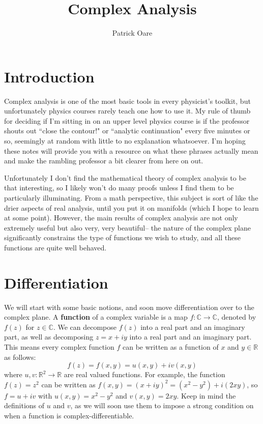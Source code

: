 \documentclass[11pt, oneside]{article}   	%
\title{Complex Analysis}
\author{Patrick Oare}
\date{}							%
\theoremstyle{definition}
\begin{document}
\maketitle
\section*{Introduction}

Complex analysis is one of the most basic tools in every physicist's toolkit, but unfortunately physics courses rarely teach 
one how to use it. My rule of thumb for deciding if I'm sitting in on an upper level physics course is if the professor shouts out 
``close the contour!" or ``analytic continuation" every five minutes or so, seemingly at random with little to no 
explanation whatsoever. I'm hoping these notes will provide you with a resource on what these phrases actually mean 
and make the rambling professor a bit clearer from here on out. 

Unfortunately I don't find the mathematical theory of complex analysis to be that interesting, so I likely won't do many proofs 
unless I find them to be particularly illuminating. From a math perspective, this subject is sort of like the drier aspects of 
real analysis, until you put it on manifolds (which I hope to learn at some point). However, the main results of complex 
analysis are not only extremely useful but also very, very beautiful-- the nature of the complex plane significantly 
constrains the type of functions we wish to study, and all these functions are quite well behaved. 

\section{Differentiation}

We will start with some basic notions, and soon move differentiation over to the complex plane. A \textbf{function} of a complex 
variable is a map $f : \mathbb C\rightarrow \mathbb C$, denoted by $f(z)$ for $z\in\mathbb C$. We can decompose 
$f(z)$ into a real part and an imaginary part, as well as decomposing $z = x + iy$ into a real part and an imaginary part. 
This means every complex function $f$ can be written as a function of $x$ and $y\in\mathbb R$ as follows:
\begin{equation}
	f(z) = f(x, y) = u(x, y) + iv(x, y)
\end{equation}
where $u, v : \mathbb R^2\rightarrow\mathbb R$ are real valued functions. For example, the function $f(z) = z^2$ can 
be written as $f(x, y) = (x + iy)^2 = (x^2 - y^2) + i(2xy)$, so $f = u + iv$ with $u(x, y) = x^2 - y^2$ and $v(x, y) = 2xy$. Keep 
in mind the definitions of $u$ and $v$, as we will soon use them to impose a strong condition on when a function is 
complex-differentiable. 
\end{document}
